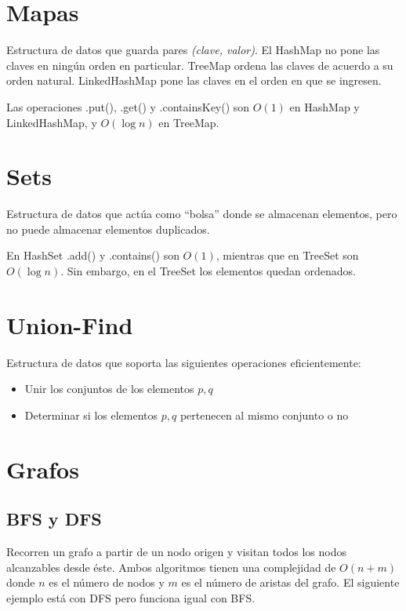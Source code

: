 \documentclass{article}
\begin{document}
\begin{multicols}{2}

\tableofcontents

\section{Mapas}
Estructura de datos que guarda pares \emph{(clave, valor)}. El HashMap no pone las claves en ningún orden en particular. TreeMap ordena las claves de acuerdo a su orden natural. LinkedHashMap pone las claves en el orden en que se ingresen.

Las operaciones .put(), .get() y .containsKey() son \( O(1) \) en HashMap y LinkedHashMap, y \( O(\log n) \) en TreeMap.


\section{Sets}
Estructura de datos que actúa como ``bolsa'' donde se almacenan elementos, pero no puede almacenar elementos duplicados.

En HashSet .add() y .contains() son \( O(1) \), mientras que en TreeSet son \( O(\log n) \). Sin embargo, en el TreeSet los elementos quedan ordenados.


\section{Union-Find}
Estructura de datos que soporta las siguientes operaciones eficientemente:
\begin{itemize}
\item Unir los conjuntos de los elementos \( p, q \)
\item Determinar si los elementos \( p, q \) pertenecen al mismo conjunto o no
\end{itemize}


\section{Grafos}
	\subsection{BFS y DFS}
	Recorren un grafo a partir de un nodo origen y visitan todos los nodos alcanzables desde éste. Ambos algoritmos tienen una complejidad de \( O(n + m) \) donde \( n \) es el número de nodos y \( m \) es el número de aristas del grafo. El siguiente ejemplo está con DFS pero funciona igual con BFS.	
	


\end{multicols}
\end{document}
